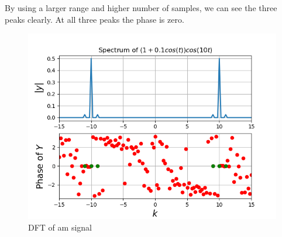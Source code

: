 \documentclass[11pt, a4paper]{article}
\begin{document}
By using a larger range and higher number of samples, we can see the three peaks clearly. At all three peaks the phase is zero.
\begin{figure}[!tbh]
   	\centering
   	\includegraphics[scale=0.5]{fig1.png}  %
   	\caption{DFT of am signal}
   	\label{fig:sample}
   \end{figure} 
\end{document}
